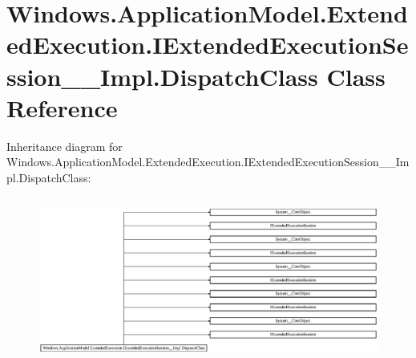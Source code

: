 \hypertarget{class_windows_1_1_application_model_1_1_extended_execution_1_1_i_extended_execution_session_____impl_1_1_dispatch_class}{}\section{Windows.\+Application\+Model.\+Extended\+Execution.\+I\+Extended\+Execution\+Session\+\_\+\+\_\+\+Impl.\+Dispatch\+Class Class Reference}
\label{class_windows_1_1_application_model_1_1_extended_execution_1_1_i_extended_execution_session_____impl_1_1_dispatch_class}
Inheritance diagram for Windows.\+Application\+Model.\+Extended\+Execution.\+I\+Extended\+Execution\+Session\+\_\+\+\_\+\+Impl.\+Dispatch\+Class\+:\begin{figure}[H]
\begin{center}
\leavevmode
\includegraphics[height=5.490196cm]{class_windows_1_1_application_model_1_1_extended_execution_1_1_i_extended_execution_session_____impl_1_1_dispatch_class}
\end{center}
\end{figure}
